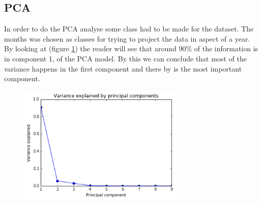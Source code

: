 \subsection{PCA}
In order to do the PCA analyse some class had to be made for the dataset. The months was chosen as classes for trying to project the data in aspect of a year. 
By looking at (figure \ref{fig:pca_2}) the reader will see that around 90\% of the information is in component 1, of the PCA model. By this we can conclude that most of the variance happens in the first component and there by is the most important component. 

\vspace{-5pt}
\begin{figure}[!ht]
	\centering
	\includegraphics[width=0.7\textwidth]{fig/pca/pca_2.png}
	\vspace{-5pt}
	\label{fig:pca_2}
\end{figure}